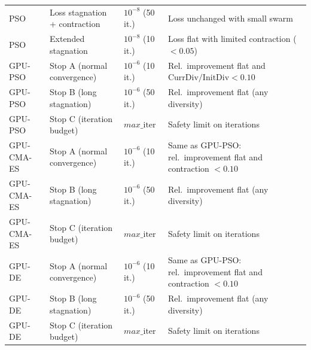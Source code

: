 \begin{table}[h]
\begin{tabular}{llll}
PSO &
Loss stagnation + contraction &
$10^{-8}$ (50 it.) &
Loss unchanged with small swarm \\

PSO &
Extended stagnation &
$10^{-8}$ (10 it.) &
Loss flat with limited contraction ($<0.05$) \\

\hline
GPU-PSO &
Stop A (normal convergence) &
$10^{-6}$ (10 it.) &
Rel.\ improvement flat and
$\mathrm{CurrDiv}/\mathrm{InitDiv}<0.10$ \\

GPU-PSO &
Stop B (long stagnation) &
$10^{-6}$ (50 it.) &
Rel.\ improvement flat (any diversity) \\

GPU-PSO &
Stop C (iteration budget) &
$max\_\mathrm{iter}$ &
Safety limit on iterations \\

\hline
GPU-CMA-ES &
Stop A (normal convergence) &
$10^{-6}$ (10 it.) &
Same as GPU-PSO:
rel.\ improvement flat and contraction $<0.10$ \\

GPU-CMA-ES &
Stop B (long stagnation) &
$10^{-6}$ (50 it.) &
Rel.\ improvement flat (any diversity) \\

GPU-CMA-ES &
Stop C (iteration budget) &
$max\_\mathrm{iter}$ &
Safety limit on iterations \\

\hline
GPU-DE &
Stop A (normal convergence) &
$10^{-6}$ (10 it.) &
Same as GPU-PSO:
rel.\ improvement flat and contraction $<0.10$ \\

GPU-DE &
Stop B (long stagnation) &
$10^{-6}$ (50 it.) &
Rel.\ improvement flat (any diversity) \\

GPU-DE &
Stop C (iteration budget) &
$max\_\mathrm{iter}$ &
Safety limit on iterations \\
\hline
\end{tabular}
\end{table}

